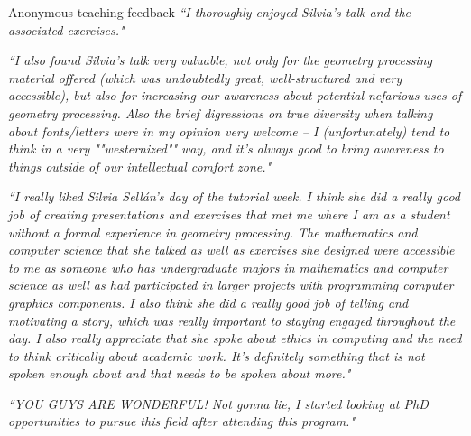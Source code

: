 \documentclass{resume} %
\begin{document}
\begin{rSection}{Anonymous teaching feedback}
{\it ``I thoroughly enjoyed Silvia's talk and the associated exercises."}

{\it ``I also found Silvia's talk very valuable, not only for the geometry processing material offered (which was undoubtedly great, well-structured and very accessible), but also for increasing our awareness about potential nefarious uses of geometry processing. Also the brief digressions on true diversity when talking about fonts/letters were in my opinion very welcome -- I (unfortunately) tend to think in a very ""westernized"" way, and it's always good to bring awareness to things outside of our intellectual comfort zone."}

{\it ``I really liked Silvia Sellán's day of the tutorial week. I think she did a really good job of creating presentations and exercises that met me where I am as a student without a formal experience in  geometry processing. The mathematics and computer science that she talked as well as exercises she designed were accessible to me as someone who has undergraduate majors in mathematics and computer science as well as had participated in larger projects with programming computer graphics components. I also think she did a really good job of telling and motivating a story, which was really important to staying engaged throughout the day. I also really appreciate that she spoke about ethics in computing and the need to think critically about  academic work. It's definitely something that is not spoken enough about and that needs to be spoken about more."}

{\it ``YOU GUYS ARE WONDERFUL! Not gonna lie, I started looking at PhD opportunities to pursue this field after attending this program."}

\end{rSection}
\end{document}
